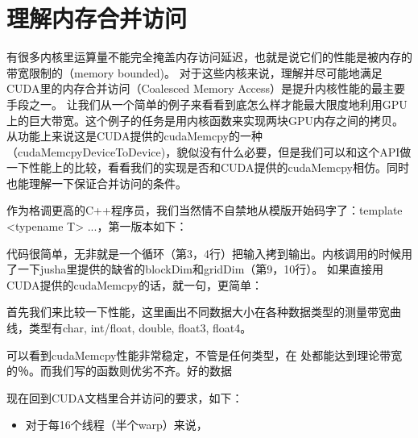 \chapter{理解内存合并访问}

有很多内核里运算量不能完全掩盖内存访问延迟，也就是说它们的性能是被内存的带宽限制的（memory bounded)。 对于这些内核来说，理解并尽可能地满足CUDA里的内存合并访问（Coalesced Memory Access）是提升内核性能的最主要手段之一。 让我们从一个简单的例子来看看到底怎么样才能最大限度地利用GPU上的巨大带宽。这个例子的任务是用内核函数来实现两块GPU内存之间的拷贝。从功能上来说这是CUDA提供的cudaMemcpy的一种（cudaMemcpyDeviceToDevice)，貌似没有什么必要，但是我们可以和这个API做一下性能上的比较，看看我们的实现是否和CUDA提供的cudaMemcpy相仿。同时也能理解一下保证合并访问的条件。

作为格调更高的C++程序员，我们当然情不自禁地从模版开始码字了：template <typename T> ...，第一版本如下：
\myvspace

代码很简单，无非就是一个循环（第3，4行）把输入拷到输出。内核调用的时候用了一下jusha里提供的缺省的blockDim和gridDim（第9，10行）。
如果直接用CUDA提供的cudaMemcpy的话，就一句，更简单：
\myvspace


首先我们来比较一下性能，这里画出不同数据大小在各种数据类型的测量带宽曲线，类型有char, int/float, double, float3, float4。

可以看到cudaMemcpy性能非常稳定，不管是任何类型，在  处都能达到理论带宽的％。而我们写的函数则优劣不齐。好的数据

现在回到CUDA文档里合并访问的要求，如下：
\begin{itemize}
\item 对于每16个线程（半个warp）来说，
\end{itemize}